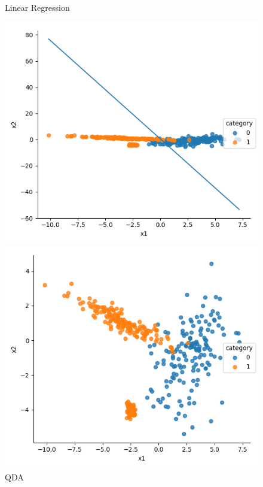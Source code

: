 \documentclass[a4paper]{article}
\begin{document}
\begin{figure}[h]
\begin{minipage}{0,45\textwidth}
\end{minipage}
\begin{minipage}{0,45\textwidth}
\caption{Linear Regression}
\includegraphics[scale=.4]{c_lr.png}
\end{minipage}
\begin{minipage}{0,45\textwidth}
\caption{QDA}
\includegraphics[scale=.4]{c_qda.png}
\end{minipage}
\end{figure}
\end{document}
